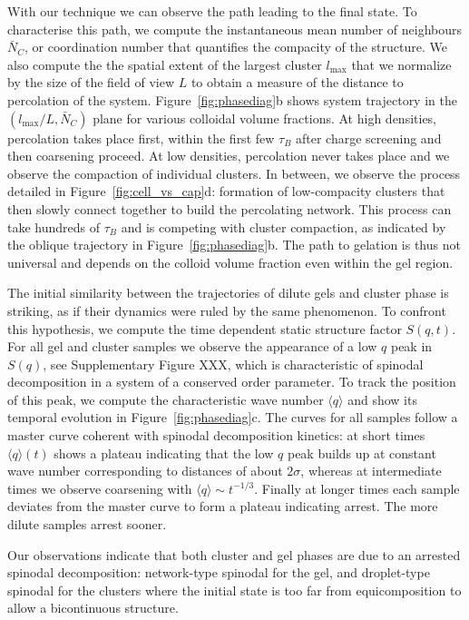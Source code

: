 With our technique we can observe the path leading to the final state. To characterise this path, we compute the instantaneous mean number of neighbours $\bar{N}_C$, or coordination number that quantifies the compacity of the structure. We also compute the the spatial extent of the largest cluster $l_\text{max}$ that we normalize by the size of the field of view $L$ to obtain a measure of the distance to percolation of the system. Figure~\ref{fig:phasediag}b shows system trajectory in the $(l_\text{max}/L, \bar{N}_C)$ plane for various colloidal volume fractions. At high densities, percolation takes place first, within the first few $\tau_B$ after charge screening and then coarsening proceed. At low densities, percolation never takes place and we observe the compaction of individual clusters. In between, we observe the process detailed in Figure~\ref{fig:cell_vs_cap}d: formation of low-compacity clusters that then slowly connect together to build the percolating network. This process can take hundreds of $\tau_B$ and is competing with cluster compaction, as indicated by the oblique trajectory in Figure~\ref{fig:phasediag}b. The path to gelation is thus not universal and depends on the colloid volume fraction even within the gel region.

The initial similarity between the trajectories of dilute gels and cluster phase is striking, as if their dynamics were ruled by the same phenomenon. To confront this hypothesis, we compute the time dependent static structure factor $S(q,t)$. For all gel and cluster samples we observe the appearance of a low $q$ peak in $S(q)$, see Supplementary Figure XXX, which is characteristic of spinodal decomposition in a system of a conserved order parameter. To track the position of this peak, we compute the characteristic wave number $\langle q \rangle$ and show its temporal evolution in Figure~\ref{fig:phasediag}c. The curves for all samples follow a master curve coherent with spinodal decomposition kinetics: at short times $\langle q \rangle(t)$ shows a plateau indicating that the low $q$ peak builds up at constant wave number corresponding to distances of about $2\sigma$, whereas at intermediate times we observe coarsening with $\langle q \rangle \sim t^{-1/3}$. Finally at longer times each sample deviates from the master curve to form a plateau indicating arrest. The more dilute samples arrest sooner.

Our observations indicate that both cluster and gel phases are due to an arrested spinodal decomposition: network-type spinodal for the gel, and droplet-type spinodal for the clusters where the initial state is too far from equicomposition to allow a bicontinuous structure.

